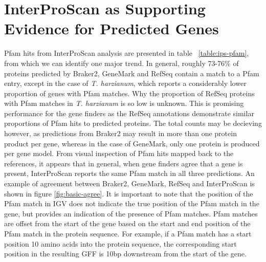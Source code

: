 \section{InterProScan as Supporting Evidence for Predicted Genes}

Pfam hits from InterProScan analysis are presented in table
~\ref{table:ips-pfam}, from which we can identify one major trend. In
general, roughly 73-76\% of proteins predicted by Braker2, GeneMark
and RefSeq contain a match to a Pfam entry, except in the case of
\textit{T. harzianum}, which reports a considerably lower
proportion of genes with Pfam matches. Why the proportion of RefSeq
proteins with Pfam matches in \textit{T. harzianum} is so low is
unknown. This is promising performance for the gene finders as the
RefSeq annotations demonstrate similar proportions of Pfam hits to
predicted proteins. The total counts may be decieving however, as
predictions from Braker2 may result in more than one protein product
per gene, whereas in the case of GeneMark, only one protein is
produced per gene model. From visual inspection of Pfam hits mapped
back to the references, it appears that in general, when gene finders
agree that a gene is present, InterProScan reports the same Pfam match
in all three predictions. An example of agreement between Braker2,
GeneMark, RefSeq and InterProScan is shown in figure
\ref{fig:basic-agree}. It is important to note that the position of
the Pfam match in IGV does not indicate the true position of the Pfam
match in the gene, but provides an indication of the presence of Pfam
matches. Pfam matches are offset from the start of the gene based on
the start and end position of the Pfam match in the protein
sequence. For example, if a Pfam match has a start position 10 amino
acids into the protein sequence, the corresponding start position in
the resulting GFF is 10bp downstream from the start of the gene.

